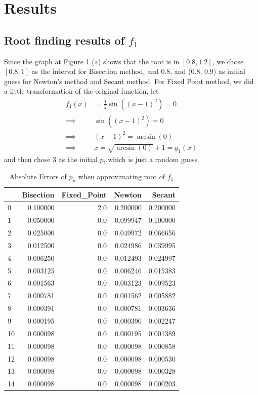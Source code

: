 \documentclass[a4paper,12pt]{article}
\begin{document}
\section{Results}

\subsection{Root finding results of $f_1$}


Since the graph at Figure 1 (a) shows that the root is in $[0.8, 1.2]$,
we chose $[0.8, 1]$ as the interval for Bisection method,
and 0.8, and (0.8, 0.9) as initial guess for Newton's method and Secant method.
For Fixed Point method, we did a little transformation of the original function,
let
$$
\begin{aligned}
f_{1}(x) & = \frac{1}{2}\sin((x - 1)^2) = 0 \\
\implies & \sin((x - 1)^2) = 0 \\
\implies & (x - 1)^2 = \arcsin(0) \\
\implies & x = \sqrt{\arcsin(0)} + 1 = g_1(x)
\end{aligned}
$$
and then chose 3 as the initial $p$, which is just a random guess.

\begin{table}
\begin{center}
	\begin{tabular}{lrrrr}
	\toprule
	{} &  Bisection &  Fixed\_Point &    Newton &    Secant \\
	\midrule
	0  &   0.100000 &          2.0 &  0.200000 &  0.200000 \\
	1  &   0.050000 &          0.0 &  0.099947 &  0.100000 \\
	2  &   0.025000 &          0.0 &  0.049972 &  0.066656 \\
	3  &   0.012500 &          0.0 &  0.024986 &  0.039995 \\
	4  &   0.006250 &          0.0 &  0.012493 &  0.024997 \\
	5  &   0.003125 &          0.0 &  0.006246 &  0.015383 \\
	6  &   0.001563 &          0.0 &  0.003123 &  0.009523 \\
	7  &   0.000781 &          0.0 &  0.001562 &  0.005882 \\
	8  &   0.000391 &          0.0 &  0.000781 &  0.003636 \\
	9  &   0.000195 &          0.0 &  0.000390 &  0.002247 \\
	10 &   0.000098 &          0.0 &  0.000195 &  0.001389 \\
	11 &   0.000098 &          0.0 &  0.000098 &  0.000858 \\
	12 &   0.000098 &          0.0 &  0.000098 &  0.000530 \\
	13 &   0.000098 &          0.0 &  0.000098 &  0.000328 \\
	14 &   0.000098 &          0.0 &  0.000098 &  0.000203 \\
	\bottomrule
	\end{tabular}
	\caption{Absolute Errors of $p_n$ when approximating root of $f_1$}
\end{center}
\end{table}
\end{document}
